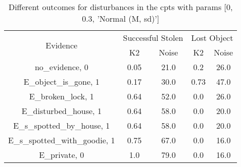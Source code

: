 \begin{table}\begin{tabular}{c|cc|cc}\toprule\multirow{2}{*}{Evidence} & \multicolumn{2}{c}{Successful Stolen} & \multicolumn{2}{c}{Lost Object} \\& {K2} & {Noise} & {K2} & {Noise} \\\midrule
no\_evidence, 0 & \cellcolor{Bittersweet}0.05&\cellcolor{Bittersweet}21.0&\cellcolor{Bittersweet}0.2&\cellcolor{Bittersweet}26.0\\E\_object\_is\_gone, 1 & \cellcolor{Bittersweet}0.17&\cellcolor{Bittersweet}30.0&\cellcolor{Bittersweet}0.73&\cellcolor{Bittersweet}47.0\\E\_broken\_lock, 1 & \cellcolor{Bittersweet}0.64&\cellcolor{Bittersweet}52.0&\cellcolor{Bittersweet}0.0&\cellcolor{Bittersweet}26.0\\E\_disturbed\_house, 1 & \cellcolor{Bittersweet}0.64&\cellcolor{Bittersweet}58.0&\cellcolor{Bittersweet}0.0&\cellcolor{Bittersweet}20.0\\E\_s\_spotted\_by\_house, 1 & \cellcolor{Bittersweet}0.64&\cellcolor{Bittersweet}58.0&\cellcolor{Bittersweet}0.0&\cellcolor{Bittersweet}20.0\\E\_s\_spotted\_with\_goodie, 1 & \cellcolor{Bittersweet}0.75&\cellcolor{Bittersweet}67.0&\cellcolor{Bittersweet}0.0&\cellcolor{Bittersweet}16.0\\E\_private, 0 & \cellcolor{Bittersweet}1.0&\cellcolor{Bittersweet}79.0&\cellcolor{Bittersweet}0.0&\cellcolor{Bittersweet}16.0\\\bottomrule\end{tabular}\caption{Different outcomes for disturbances in the cpts with params [0, 0.3, 'Normal (M, sd)']}\end{table}
